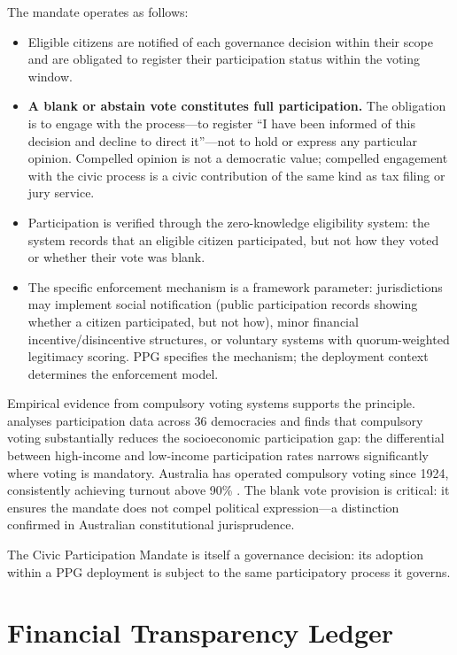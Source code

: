 \documentclass[12pt,a4paper,oneside]{report}
\begin{document}
The mandate operates as follows:

\begin{itemize}
  \item Eligible citizens are notified of each governance decision within their scope and are obligated to register their participation status within the voting window.
  \item \textbf{A blank or abstain vote constitutes full participation.} The obligation is to engage with the process---to register ``I have been informed of this decision and decline to direct it''---not to hold or express any particular opinion. Compelled opinion is not a democratic value; compelled engagement with the civic process is a civic contribution of the same kind as tax filing or jury service.
  \item Participation is verified through the zero-knowledge eligibility system: the system records that an eligible citizen participated, but not how they voted or whether their vote was blank.
  \item The specific enforcement mechanism is a framework parameter: jurisdictions may implement social notification (public participation records showing whether a citizen participated, but not how), minor financial incentive/disincentive structures, or voluntary systems with quorum-weighted legitimacy scoring. PPG specifies the mechanism; the deployment context determines the enforcement model.
\end{itemize}

Empirical evidence from compulsory voting systems supports the principle. \citet{lijphart1997unequal} analyses participation data across 36 democracies and finds that compulsory voting substantially reduces the socioeconomic participation gap: the differential between high-income and low-income participation rates narrows significantly where voting is mandatory. Australia has operated compulsory voting since 1924, consistently achieving turnout above 90\% \citep{idea2021global}. The blank vote provision is critical: it ensures the mandate does not compel political expression---a distinction confirmed in Australian constitutional jurisprudence.

The Civic Participation Mandate is itself a governance decision: its adoption within a PPG deployment is subject to the same participatory process it governs.

\section{Financial Transparency Ledger}
\label{sec:ledger}
\end{document}
